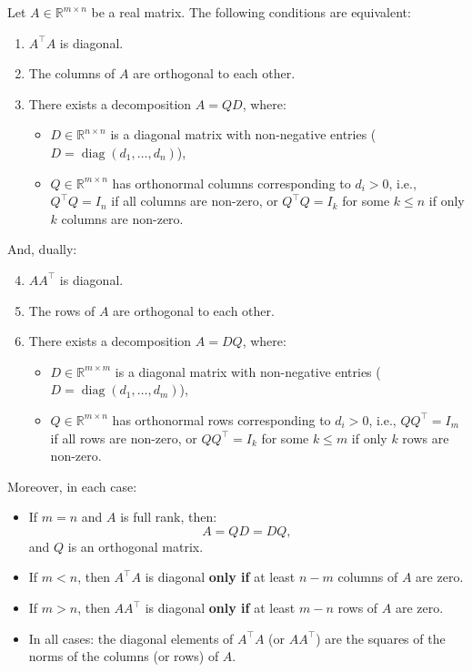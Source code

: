 \documentclass[
	11pt, %
	fleqn, %
	a4paper, %
]{LegrandOrangeBook}
\begin{document}
\begin{theorem}
Let \( A \in \mathbb{R}^{m \times n} \) be a real matrix. The following conditions are equivalent:

\begin{enumerate}
    \item \( A^\top A \) is diagonal.
    \item The columns of \( A \) are orthogonal to each other.
    \item There exists a decomposition \( A = Q D \), where:
    \begin{itemize}
        \item \( D \in \mathbb{R}^{n \times n} \) is a diagonal matrix with non-negative entries (\( D = \operatorname{diag}(d_1, \dots, d_n) \)),
        \item \( Q \in \mathbb{R}^{m \times n} \) has orthonormal columns corresponding to \( d_i > 0 \), i.e., \( Q^\top Q = I_n \) if all columns are non-zero, or \( Q^\top Q = I_k \) for some \( k \leq n \) if only \( k \) columns are non-zero.
    \end{itemize}
\end{enumerate}

And, dually:

\begin{enumerate}
    \setcounter{enumi}{3}
    \item \( A A^\top \) is diagonal.
    \item The rows of \( A \) are orthogonal to each other.
    \item There exists a decomposition \( A = D Q \), where:
    \begin{itemize}
        \item \( D \in \mathbb{R}^{m \times m} \) is a diagonal matrix with non-negative entries (\( D = \operatorname{diag}(d_1, \dots, d_m) \)),
        \item \( Q \in \mathbb{R}^{m \times n} \) has orthonormal rows corresponding to \( d_i > 0 \), i.e., \( Q Q^\top = I_m \) if all rows are non-zero, or \( Q Q^\top = I_k \) for some \( k \leq m \) if only \( k \) rows are non-zero.
    \end{itemize}
\end{enumerate}

Moreover, in each case:

\begin{itemize}
    \item If \( m = n \) and \( A \) is full rank, then:
    \[
    A = Q D = D Q,
    \]
    and \( Q \) is an orthogonal matrix.
    \item If \( m < n \), then \( A^\top A \) is diagonal \textbf{only if} at least \( n - m \) columns of \( A \) are zero.
    \item If \( m > n \), then \( A A^\top \) is diagonal \textbf{only if} at least \( m - n \) rows of \( A \) are zero.
    \item In all cases: the diagonal elements of \( A^\top A \) (or \( A A^\top \)) are the squares of the norms of the columns (or rows) of \( A \).
\end{itemize}
\end{theorem}
\end{document}
